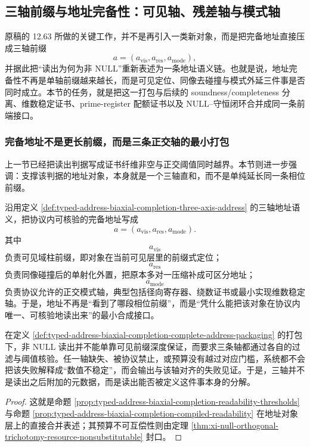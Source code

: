 \subsection{三轴前缀与地址完备性：可见轴、残差轴与模式轴}\label{subsec:typed-address-biaxial-completion-three-axis-address-completeness}
原稿的 12.63 所做的关键工作，并不是再引入一类新对象，而是把完备地址直接压成三轴前缀
\[
a=(a_{\mathrm{vis}},a_{\mathrm{res}},a_{\mathrm{mode}}),
\]
并据此把“读出为何为非 \(\mathrm{NULL}\)”重新表述为一条地址语义链。也就是说，地址完备性不再是单轴前缀越来越长，而是可见定位、同像去碰撞与模式外延三件事是否同时成立。本节的任务，就是把这一打包与后续的 soundness/completeness 分离、维数稳定证书、prime-register 配额证书以及 \(\mathrm{NULL}\)--守恒闭环合并成同一条前端接口。

\subsubsection{完备地址不是更长前缀，而是三条正交轴的最小打包}\label{subsubsec:typed-address-biaxial-completion-complete-address-packaging}
上一节已经把读出判据写成证书纤维非空与正交阈值同时越界。本节则进一步强调：支撑该判据的地址对象，本身就是一个三轴直和，而不是单纯延长同一条相位前缀。

\begin{definition}[完备地址的三轴打包]\label{def:typed-address-biaxial-completion-complete-address-packaging}
沿用定义 \ref{def:typed-address-biaxial-completion-three-axis-address} 的三轴地址语义，把协议内可核验的完备地址写成
\[
a=(a_{\mathrm{vis}},a_{\mathrm{res}},a_{\mathrm{mode}}).
\]
其中
\[
a_{\mathrm{vis}}
\]
负责可见域柱前缀，即对象在当前可见层里的前缀式定位；
\[
a_{\mathrm{res}}
\]
负责同像碰撞后的单射化外置，把原本多对一压缩补成可区分地址；
\[
a_{\mathrm{mode}}
\]
负责协议允许的正交模式轴，典型包括径向寄存器、绕数证书或最小实现维数稳定轴。于是，地址不再是“看到了哪段相位前缀”，而是“凭什么能把该对象在协议内唯一、可核验地读出来”的最小合成接口。
\end{definition}

\begin{proposition}\label{prop:typed-address-biaxial-completion-nonnull-requires-three-axes}
在定义 \ref{def:typed-address-biaxial-completion-complete-address-packaging} 的打包下，非 \(\mathrm{NULL}\) 读出并不能单靠可见前缀深度保证，而要求三条轴都通过各自的过滤与阈值核验。任一轴缺失、被协议禁止，或预算没有越过对应门槛，系统都不会把该失败解释成“数值不稳定”，而会输出与该轴对齐的失败见证。于是，三轴并不是读出之后附加的元数据，而是读出能否被定义这件事本身的分解。
\end{proposition}
\begin{proof}
这就是命题 \ref{prop:typed-address-biaxial-completion-readability-thresholds} 与命题 \ref{prop:typed-address-biaxial-completion-compiled-readability} 在地址对象层上的直接合并表述；其预算不可互偿性则由定理 \ref{thm:xi-null-orthogonal-trichotomy-resource-nonsubstitutable} 封口。
\end{proof}

